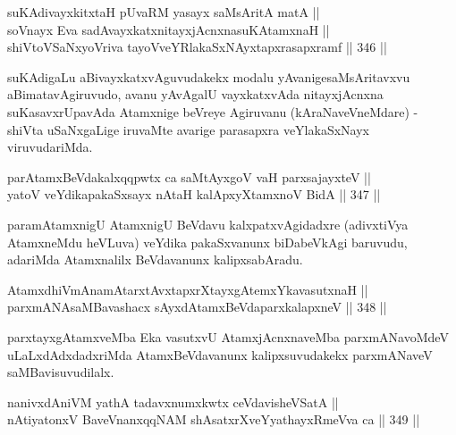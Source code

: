 
\begin{shl}
suKAdivayxkitxtaH pUvaRM yasayx saMsAritA matA || \\
soV\s nayx Eva sadAvayxkatxnitayxjAcnxnasuKAtamxnaH || \\
shiVtoVSaNxyoVriva tayoVveYRlakaSxNAyxtapxrasapxramf \hfill || 346 ||  
\end{shl}

\begin{artha}
suKAdigaLu aBivayxkatxvAguvudakekx modalu yAvanige\break saMsAritavxvu
aBimatavAgiruvudo, avanu yAvAgalU vayxkatxvAda nitayxjAcnxna
suKasavxrUpavAda Atamxnige beVreye Agiruvanu (kAraNaveVneMdare) -
shiVta uSaNxgaLige iruvaMte avarige parasapxra veYlakaSxNayx
viruvudariMda.
\end{artha}

\begin{shl}
parAtamxBeVdakalxqqpwtx ca saMtAyxgoV vaH parxsajayxteV || \\
yatoV veYdikapakaSxsayx nAtaH kalApxyX\s \s tamxnoV BidA \hfill || 347 ||  
\end{shl}

\begin{artha}
paramAtamxnigU AtamxnigU BeVdavu kalxpatxvAgidadxre (adivxtiVya
AtamxneMdu heVLuva) veYdika pakaSxvanunx biDabeVkAgi baruvudu,
adariMda Atamxnalilx BeVdavanunx kalipxsabAradu.
\end{artha}


\begin{shl}
AtamxdhiVmAnamAtarxtAvxtapxrXtayxgAtemxYkavasutxnaH || \\
parxmANAsaMBavashacx sAyxdAtamxBeVdaparxkalapxneV \hfill || 348 ||  
\end{shl}

\begin{artha}
parxtayxgAtamxveMba Eka vasutxvU AtamxjAcnxnaveMba parxmANavoMdeV
uLaLxdAdxdadxriMda AtamxBeVdavanunx kalipxsuvudakekx parxmANaveV
saMBavisuvudilalx.
\end{artha}

\begin{shl}
nanivxdAniVM yathA tadavxnumxkwtx ceVdavisheVSatA || \\
nAtiyatonxV BaveVnanxqqNAM shAsatxrXveYyathayxRmeVva ca \hfill || 349 ||  
\end{shl}

